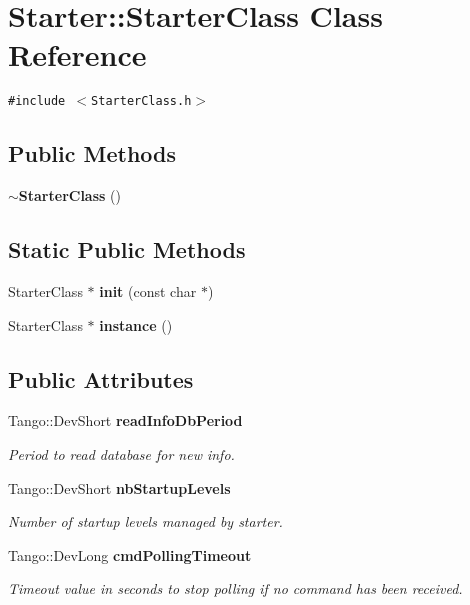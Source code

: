 \section{Starter::Starter\-Class  Class Reference}
\label{classStarter_1_1StarterClass}
{\tt \#include $<$Starter\-Class.h$>$}

\subsection*{Public Methods}
\begin{CompactItemize}
\item 
{\bf $\sim$Starter\-Class} ()
\end{CompactItemize}
\subsection*{Static Public Methods}
\begin{CompactItemize}
\item 
Starter\-Class $\ast$ {\bf init} (const char $\ast$)
\item 
Starter\-Class $\ast$ {\bf instance} ()
\end{CompactItemize}
\subsection*{Public Attributes}
\begin{CompactItemize}
\item 
Tango::Dev\-Short {\bf read\-Info\-Db\-Period}
\begin{CompactList}\small\item\em Period to read database for new info.\item\end{CompactList}\item 
Tango::Dev\-Short {\bf nb\-Startup\-Levels}
\begin{CompactList}\small\item\em Number of startup levels managed by starter.\item\end{CompactList}\item 
Tango::Dev\-Long {\bf cmd\-Polling\-Timeout}
\begin{CompactList}\small\item\em Timeout value in seconds to stop polling if no command has been received.\item\end{CompactList}\end{CompactItemize}
